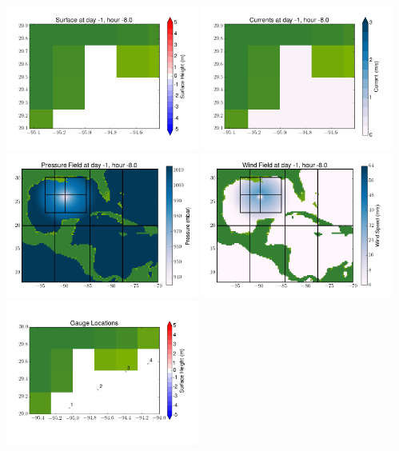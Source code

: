 \documentclass[11pt]{article}
\begin{document}
\includegraphics[width=0.475\textwidth]{frame0040fig6.png}
\vskip 10pt 
\includegraphics[width=0.475\textwidth]{frame0040fig7.png}
\includegraphics[width=0.475\textwidth]{frame0040fig8.png}
\vskip 10pt 
\includegraphics[width=0.475\textwidth]{frame0040fig9.png}
\includegraphics[width=0.475\textwidth]{frame0040fig10.png}
\end{document}
